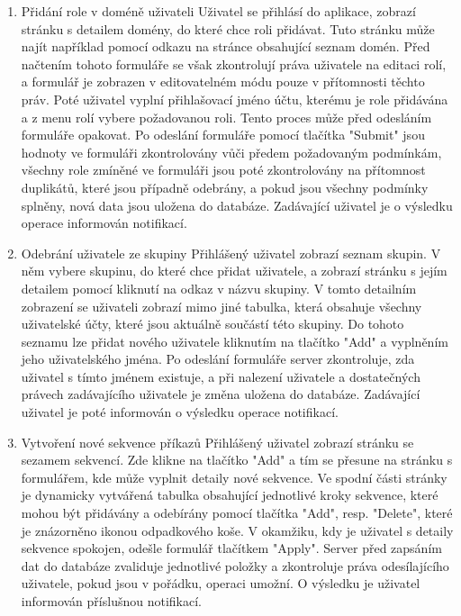 {\begin{enumerate}
Pokud ale uživatel zvládne přímo identifikovat hledaný kanál ze seznamu všech kanálů, může využít stránku se seznamem kanálů a díky odkazu ve jméně kanálu přejít na detailní zobrazení komunikačního kanálu v méně krocích. V obou případech však platí, že stránky se uživateli načtou pouze v případě, že má k jejich zobrazení právo. V opačném případě je uživatel přesměrován na domovskou stránku.
\item{Přidání role v doméně uživateli}
Uživatel se přihlásí do aplikace, zobrazí stránku s detailem domény, do které chce roli přidávat. Tuto stránku může najít například pomocí odkazu na stránce obsahující seznam domén. Před načtením tohoto formuláře se však zkontrolují práva uživatele na editaci rolí, a formulář je zobrazen v editovatelném módu pouze v přítomnosti těchto práv. Poté uživatel vyplní přihlašovací jméno účtu, kterému je role přidávána a z menu rolí vybere požadovanou roli. Tento proces může před odesláním formuláře opakovat. Po odeslání formuláře pomocí tlačítka "Submit" jsou hodnoty ve formuláři zkontrolovány vůči předem požadovaným podmínkám, všechny role zmíněné ve formuláři jsou poté zkontrolovány na přítomnost duplikátů, které jsou případně odebrány, a pokud jsou všechny podmínky splněny, nová data jsou uložena do databáze. Zadávající uživatel je o výsledku operace informován notifikací.
\item{Odebrání uživatele ze skupiny}
Přihlášený uživatel zobrazí seznam skupin. V něm vybere skupinu, do které chce přidat uživatele, a zobrazí stránku s jejím detailem pomocí kliknutí na odkaz v názvu skupiny. V tomto detailním zobrazení se uživateli zobrazí mimo jiné tabulka, která obsahuje všechny uživatelské účty, které jsou aktuálně součástí této skupiny. Do tohoto seznamu lze přidat nového uživatele kliknutím na tlačítko "Add" a vyplněním jeho uživatelského jména. Po odeslání formuláře server zkontroluje, zda uživatel s tímto jménem existuje, a při nalezení uživatele a dostatečných právech zadávajícího uživatele je změna uložena do databáze. Zadávající uživatel je poté informován o výsledku operace notifikací.
\item{Vytvoření nové sekvence příkazů}
Přihlášený uživatel zobrazí stránku se sezamem sekvencí. Zde klikne na tlačítko "Add" a tím se přesune na stránku s formulářem, kde může vyplnit detaily nové sekvence. Ve spodní části stránky je dynamicky vytvářená tabulka obsahující jednotlivé kroky sekvence, které mohou být přidávány a odebírány pomocí tlačítka "Add", resp. "Delete", které je znázorněno ikonou odpadkového koše. V okamžiku, kdy je uživatel s detaily sekvence spokojen, odešle formulář tlačítkem "Apply". Server před zapsáním dat do databáze zvaliduje jednotlivé položky a zkontroluje práva odesílajícího uživatele, pokud jsou v pořádku, operaci umožní. O výsledku je uživatel informován příslušnou notifikací.
\end{enumerate}
} %
